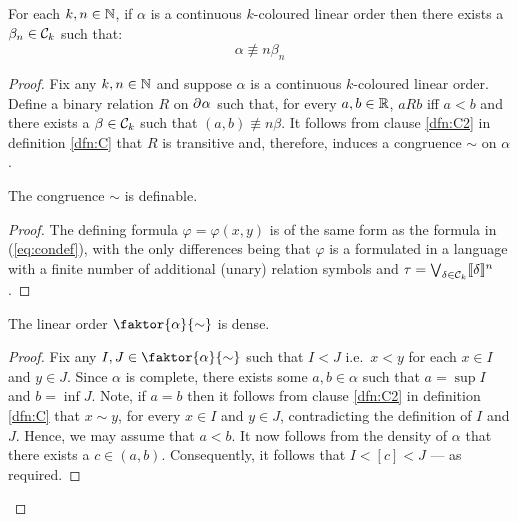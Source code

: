 \begin{thm}\label{thm:Cll}
	For each $k,n\in\mathbb{N}$, if $\alpha$ is a continuous $k$-coloured linear order then there exists a $\beta_n\in\mathcal{C}_k$ such that:
	\begin{equation}
		\alpha\nequiv{n}\beta_n
	\end{equation}
\end{thm}
\begin{proof}
	Fix any $k,n\in\mathbb{N}$ and suppose $\alpha$ is a continuous $k$-coloured linear order.  Define a binary relation $R$ on $\partial^{}\alpha$ such that, for every $a,b\in\mathbb{R}$, $aRb$ iff  $a<b$ and there exists a $\beta\in\mathcal{C}_k$ such that $(a,b)\nequiv{n}\beta$.  It follows from clause \ref{dfn:C2} in definition \ref{dfn:C} that $R$ is transitive and, therefore, induces a congruence $\sim$ on $\alpha$.

	\begin{claim}
		The congruence $\sim$ is definable.
	\end{claim}
	\begin{proof}
		The defining formula $\varphi=\varphi(x,y)$ is of the same form as the formula in (\ref{eq:condef}), with the only differences being that $\varphi$ is a formulated in a language with a finite number of additional (unary) relation symbols and $\tau=\bigvee_{\delta\in\mathcal{C}_k}\llbracket\delta\rrbracket^{n}$.
	\end{proof}

	\begin{claim}
		The linear order $\faktor{\alpha}{\sim}$ is dense.
	\end{claim}
	\begin{proof}
		Fix any $I,J\in\faktor{\alpha}{\sim}$ such that $I<J$ i.e.\ $x<y$ for each $x\in I$ and $y\in J$.  Since $\alpha$ is complete, there exists some $a,b\in\alpha$ such that $a=\sup I$ and $b=\inf J$.  Note, if $a=b$ then it follows from clause \ref{dfn:C2} in definition \ref{dfn:C} that $x\sim y$, for every $x\in I$ and $y\in J$, contradicting the definition of $I$ and $J$.  Hence, we may assume that $a<b$.  It now follows from the density of $\alpha$ that there exists a $c\in (a,b)$.  Consequently, it follows that $I<[c]<J$ --- as required.
	\end{proof}


\end{proof}
